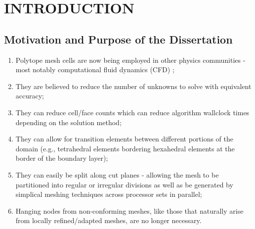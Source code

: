 %
%
%
\pagestyle{plain} %
\setcounter{page}{1}

\chapter{\uppercase {Introduction}}
\label{sec::Intro}

\section{Motivation and Purpose of the Dissertation}
\label{sec::Intro_Purpose}


\begin{enumerate}
	\item Polytope mesh cells are now being employed in other physics communities - most notably computational fluid dynamics (CFD) \cite{ref::star_CCM};
	\item They are believed to reduce the number of unknowns to solve with equivalent accuracy;
	\item They can reduce cell/face counts which can reduce algorithm wallclock times depending on the solution method;
	\item They can allow for transition elements between different portions of the domain (e.g., tetrahedral elements bordering hexahedral elements at the border of the boundary layer);
	\item They can easily be split along cut planes - allowing the mesh to be partitioned into regular or irregular divisions as well as be generated by simplical meshing techniques across processor sets in parallel;
	\item Hanging nodes from non-conforming meshes, like those that naturally arise from locally refined/adapted meshes, are no longer necessary. 
\end{enumerate}


